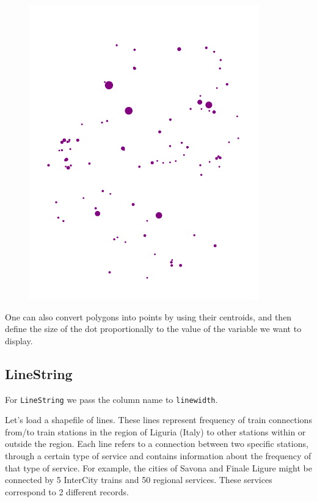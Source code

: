 \documentclass[
  letterpaper,
  DIV=11,
  numbers=noendperiod]{scrreprt}
\begin{document}
\begin{figure}[H]

{\centering \includegraphics{labs/w02_maps_files/figure-pdf/cell-51-output-1.png}

}

\end{figure}

One can also convert polygons into points by using their centroids, and
then define the size of the dot proportionally to the value of the
variable we want to display.

\hypertarget{linestring}{%
\subsection{LineString}\label{linestring}}

For \texttt{LineString} we pass the column name to \texttt{linewidth}.

Let's load a shapefile of lines. These lines represent frequency of
train connections from/to train stations in the region of Liguria
(Italy) to other stations within or outside the region. Each line refers
to a connection between two specific stations, through a certain type of
service and contains information about the frequency of that type of
service. For example, the cities of Savona and Finale Ligure might be
connected by 5 InterCity trains and 50 regional services. These services
correspond to 2 different records.
\end{document}
